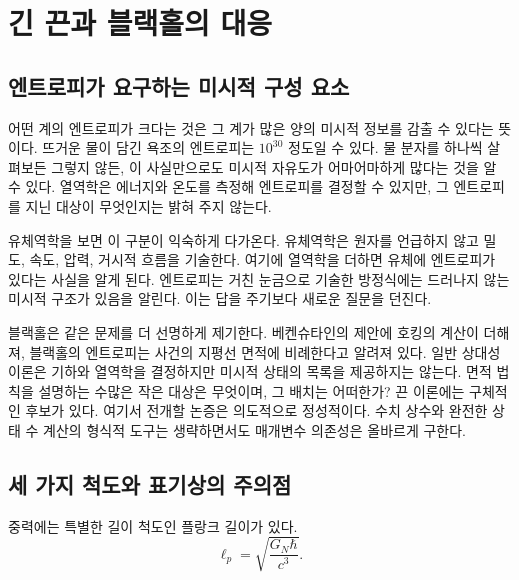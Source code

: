 \chapter{긴 끈과 블랙홀의 대응}


\section{엔트로피가 요구하는 미시적 구성 요소}

어떤 계의 엔트로피가 크다는 것은 그 계가 많은 양의 미시적 정보를 감출 수 있다는 뜻이다. 뜨거운 물이 담긴 욕조의 엔트로피는 \(10^{30}\) 정도일 수 있다. 물 분자를 하나씩 살펴보든 그렇지 않든, 이 사실만으로도 미시적 자유도가 어마어마하게 많다는 것을 알 수 있다. 열역학은 에너지와 온도를 측정해 엔트로피를 결정할 수 있지만, 그 엔트로피를 지닌 대상이 무엇인지는 밝혀 주지 않는다.

유체역학을 보면 이 구분이 익숙하게 다가온다. 유체역학은 원자를 언급하지 않고 밀도, 속도, 압력, 거시적 흐름을 기술한다. 여기에 열역학을 더하면 유체에 엔트로피가 있다는 사실을 알게 된다. 엔트로피는 거친 눈금으로 기술한 방정식에는 드러나지 않는 미시적 구조가 있음을 알린다. 이는 답을 주기보다 새로운 질문을 던진다.

블랙홀은 같은 문제를 더 선명하게 제기한다. 베켄슈타인의 제안에 호킹의 계산이 더해져, 블랙홀의 엔트로피는 사건의 지평선 면적에 비례한다고 알려져 있다. 일반 상대성 이론은 기하와 열역학을 결정하지만 미시적 상태의 목록을 제공하지는 않는다. 면적 법칙을 설명하는 수많은 작은 대상은 무엇이며, 그 배치는 어떠한가? 끈 이론에는 구체적인 후보가 있다. 여기서 전개할 논증은 의도적으로 정성적이다. 수치 상수와 완전한 상태 수 계산의 형식적 도구는 생략하면서도 매개변수 의존성은 올바르게 구한다.

\section{세 가지 척도와 표기상의 주의점}

중력에는 특별한 길이 척도인 플랑크 길이가 있다.
\begin{equation}
\ell_p=\sqrt{\frac{G_N\hbar}{c^3}}.
\label{eq:l06-planck-si}
\end{equation}

